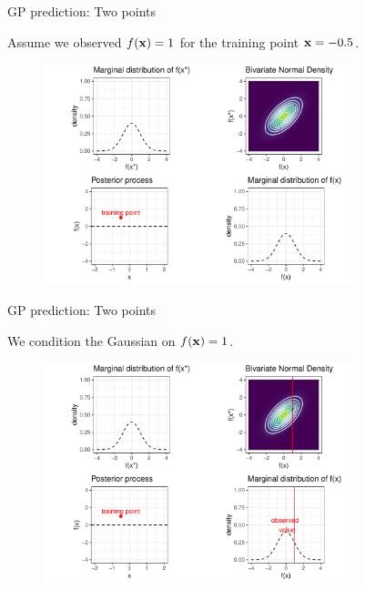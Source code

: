 \begin{frame}{GP prediction: Two points}

\begin{footnotesize}
  Assume we observed $f(\mathbf{x}) = 1$ for the training point $\mathbf{x} = -0.5$.  
\end{footnotesize}\vspace*{0.2cm}

\begin{figure}
  \includegraphics[width=0.8\textwidth]{figure/gp_pred/2.pdf}
\end{figure}

\end{frame}
\begin{frame}{GP prediction: Two points}

\begin{footnotesize}
  We condition the Gaussian on $f(\mathbf{x}) = 1$.
\end{footnotesize}\vspace*{0.2cm}

\begin{figure}
  \includegraphics[width=0.8\textwidth]{figure/gp_pred/3.pdf}
\end{figure}

\end{frame}


